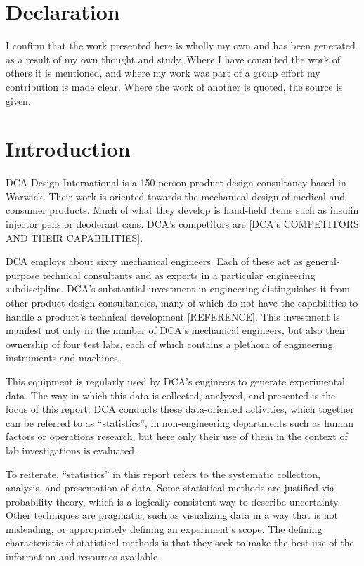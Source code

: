 \documentclass[11pt,a4paper,article]{memoir} %
\begin{document}
\chapter*{\large Declaration}
\vspace*{-\baselineskip}
I confirm that the work presented here is wholly my own and has been generated as a result of my own thought and study. Where I have consulted the work of others it is mentioned, and where my work was part of a group effort my contribution is made clear. Where the work of another is quoted, the source is given.



\newpage
\chapter{Introduction}
DCA Design International is a 150-person product design consultancy based in Warwick. Their work is oriented towards the mechanical design of medical and consumer products. Much of what they develop is hand-held items such as insulin injector pens or deoderant cans. DCA's competitors are [DCA's COMPETITORS AND THEIR CAPABILITIES].
\par
DCA employs about sixty mechanical engineers. Each of these act as general-purpose technical consultants and as experts in a particular engineering subdiscipline. DCA's substantial investment in engineering distinguishes it from other product design consultancies, many of which do not have the capabilities to handle a product's technical development [REFERENCE]. This investment is manifest not only in the number of DCA's mechanical engineers, but also their ownership of four test labs, each of which contains a plethora of engineering instruments and machines.
\par
This equipment is regularly used by DCA's engineers to generate experimental data. The way in which this data is collected, analyzed, and presented is the focus of this report. DCA conducts these data-oriented activities, which together can be referred to as ``statistics'', in non-engineering departments such as human factors or operations research, but here only their use of them in the context of lab investigations is evaluated.
\par
To reiterate, ``statistics'' in this report refers to the systematic collection, analysis, and presentation of data. Some statistical methods are justified via probability theory, which is a logically consistent way to describe uncertainty. Other techniques are pragmatic, such as visualizing data in a way that is not misleading, or appropriately defining an experiment's scope. The defining characteristic of statistical methods is that they seek to make the best use of the information and resources available.
\end{document}

